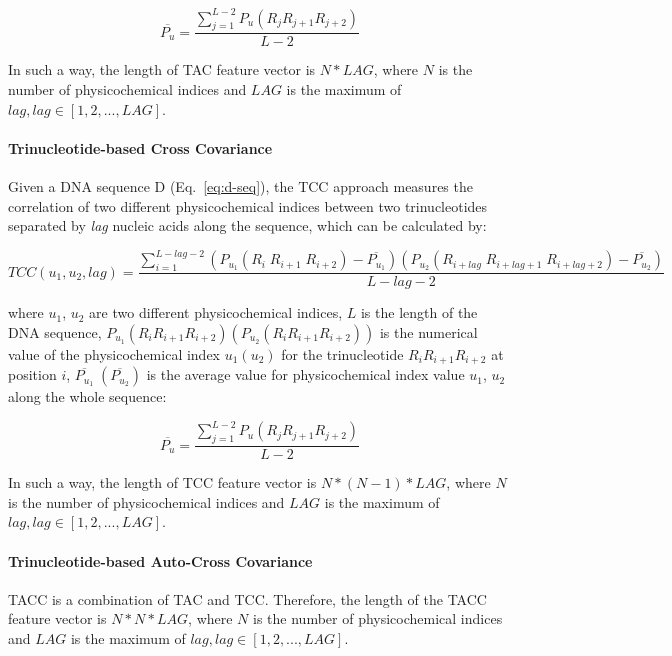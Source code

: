\begin{equation}\label{eq:tac-2}
    \overline{P_{u}} = \frac{\sum_{j=1}^{L-2}P_{u}(R_{j}R_{j+1}R_{j+2})}{L-2}
\end{equation}

In such a way, the length of \gls{TAC} feature vector is $N*LAG$, where $N$ is the number of physicochemical indices and $LAG$ is the maximum of $lag, lag \in [1,2,...,LAG]$.

\paragraph{Trinucleotide-based Cross Covariance}

Given a DNA sequence D (Eq.~\ref{eq:d-seq}), the \gls{TCC} approach measures the correlation of two different physicochemical indices between two trinucleotides separated by \textit{lag} nucleic acids along the sequence, which can be calculated by:

\begin{equation}\label{eq:TCC}
    TCC(u_{1},u_{2},lag) = \frac{\sum_{i=1}^{L-lag-2}(P_{u_{1}}(R_{i}\;R_{i+1}\;R_{i+2}) - \overline{P_{u_{1}}})(P_{u_{2}}(R_{i+lag}\;R_{i+lag+1}\;R_{i+lag+2}) - \overline{P_{u_{2}}})}{L-lag-2}
\end{equation}

where $u_{1}$, $u_{2}$ are two different physicochemical indices, $L$ is the length of the DNA sequence, $P_{u_{1}}(R_{i}R_{i+1}R_{i+2}) (P_{u_{2}}(R_{i}R_{i+1}R_{i+2}))$ is the numerical value of the physicochemical index $u_{1}(u_{2})$ for the trinucleotide $R_{i}R_{i+1}R_{i+2}$ at position $i$, $\overline{P_{u_{1}}}\;(\overline{P_{u_{2}}})$ is the average value for physicochemical index value $u_{1}$, $u_{2}$ along the whole sequence:

\begin{equation}\label{eq:TCC-PU2}
    \overline{P_{u}} = \frac{\sum_{j=1}^{L-2}P_{u}(R_{j}R_{j+1}R_{j+2})}{L-2}
\end{equation}

In such a way, the length of \gls{TCC} feature vector is $N*(N-1)*LAG$, where $N$ is the number of physicochemical indices and $LAG$ is the maximum of $lag, lag \in [1,2,...,LAG]$.


\paragraph{Trinucleotide-based Auto-Cross Covariance}
\gls{TACC} is a combination of \gls{TAC} and \gls{TCC}. Therefore, the length of the \gls{TACC} feature vector is $N*N*LAG$, where $N$ is the number of physicochemical indices and $LAG$ is the maximum of $lag, lag \in [1,2,...,LAG]$.

